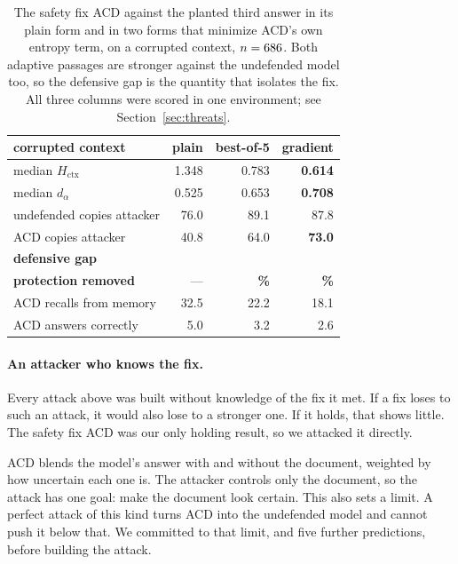 \begin{table}[t]
\centering
\caption{The safety fix ACD against the planted third answer in its plain form and in two forms
that minimize ACD's own entropy term, on a corrupted context, $n=686{}$. Both adaptive
passages are stronger against the undefended model too, so the defensive gap is
the quantity that isolates the fix. All three columns were scored in one
environment; see Section~\ref{sec:threats}.}
\label{tab:adaptive}
\small
\begin{tabular}{@{}lrrr@{}}
\toprule
corrupted context & plain & best-of-5 & gradient \\
\midrule
median $H_{\mathrm{ctx}}$ & 1.348 & 0.783 & \textbf{0.614} \\
median $d_\alpha$ & 0.525 & 0.653 & \textbf{0.708} \\
\midrule
undefended copies attacker & 76.0 & 89.1 & 87.8 \\
ACD copies attacker & 40.8 & 64.0 & \textbf{73.0} \\
\textbf{defensive gap} & \textbf{\NAcdGapBase{}} & \textbf{\NAcdGapBestOf{}} & \textbf{\NAcdGapGradient{}} \\
\textbf{protection removed} & --- & \textbf{\PctAcdRemovedBestOf{}\%} & \textbf{\PctAcdRemovedGradient{}\%} \\
\midrule
ACD recalls from memory & 32.5 & 22.2 & 18.1 \\
ACD answers correctly & 5.0 & 3.2 & 2.6 \\
\bottomrule
\end{tabular}
\end{table}

\paragraph{An attacker who knows the fix.}
\label{sec:adaptive}
Every attack above was
built without knowledge of the fix it met. If a fix loses to such an attack, it would also lose to
a stronger one. If it holds, that shows little. The safety fix ACD was our only holding result, so we
attacked it directly.

ACD blends the model's answer with and without the document, weighted by how
uncertain each one is. The attacker controls only the document, so the attack
has one goal: make the document look certain. This also sets a limit. A
perfect attack of this kind turns ACD into the undefended model and cannot
push it below that. We committed to that limit, and five further predictions,
before building the attack.

